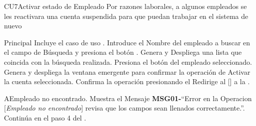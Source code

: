 \begin{UseCase}{CU7}{Activar estado de Empleado}{
		Por razones laborales, a algunos empleados se les reactivara una cuenta suspendida para que puedan trabajar en el sistema de nuevo
	}
	\end{UseCase}
	\begin{UCtrayectoria}{Principal}
		\UCpaso Incluye el caso de uso .
		\UCpaso[\UCactor] Introduce el Nombre del empleado a buscar en el campo de Búsqueda y presiona el botón  .
		\UCpaso Genera y Despliega una lista que coincida con la búsqueda realizada.
		\UCpaso[\UCactor] Presiona el botón del empleado seleccionado.
		\UCpaso Genera y despliega la ventana emergente  para confirmar la operación de Activar la cuenta seleccionada.
		\UCpaso [\UCactor] Confirma la operación presionando el 
		\UCpaso Redirige al [\UCactor] a la  .
	\end{UCtrayectoria}


\begin{UCtrayectoriaA}{A}{Empleado no encontrado.}
			\UCpaso Muestra el Mensaje {\bf MSG01-}``Error en la Operacion [{\em Empleado no encontrado}] revisa que los campos sean llenados correctamente.''.
			\UCpaso Continúa en el paso 4 del .
		\end{UCtrayectoriaA}
